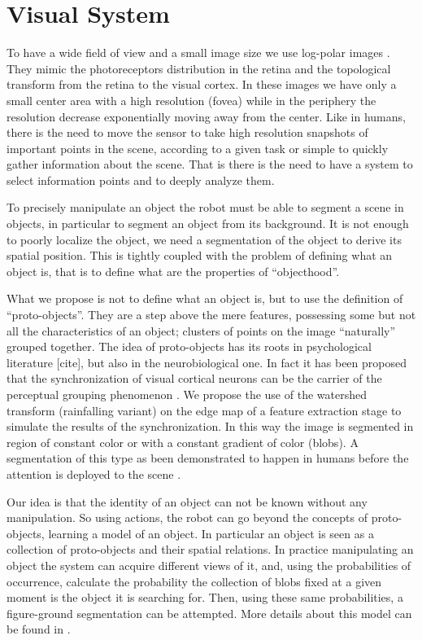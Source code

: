 \section{Visual System}
To have a wide field of view and a small image size we use log-polar images \cite{sandini80retinalike}. They mimic the photoreceptors distribution in the retina and the topological transform from the retina to the visual cortex. In these images we have only a small center area with a high resolution (fovea) while in the periphery the resolution decrease exponentially moving away from the center. Like in humans, there is the need to move the sensor to take high resolution snapshots of important points in the scene, according to a given task or simple to quickly gather information about the scene. That is there is the need to have a system to select information points and to deeply analyze them.

To precisely manipulate an object the robot must be able to segment a scene in objects, in particular to segment an object from its background. It is not enough to poorly localize the object, we need a segmentation of the object to derive its spatial position. This is tightly coupled with the problem of defining what an object is, that is to define what are the properties of ``objecthood''.

What we propose is not to define what an object is, but to use the definition of ``proto-objects''. They are a step above the mere features, possessing some but not all the characteristics of an object; clusters of points on the image ``naturally'' grouped together. The idea of proto-objects has its roots in psychological literature [cite], but also in the neurobiological one. In fact it has been proposed that the synchronization of visual cortical neurons can be the carrier of the perceptual grouping phenomenon \cite{eckhorn88coherent,gray89oscillatory}. We propose the use of the watershed transform (rainfalling variant) \cite{smet00rainfalling} on the edge map of a feature extraction stage to simulate the results of the synchronization. In this way the image is segmented in region of constant color or with a constant gradient of color (blobs). A segmentation of this type as been demonstrated to happen in humans before the attention is deployed to the scene \cite{driver00segmentation}.

Our idea is that the identity of an object can not be known without any manipulation. So using actions, the robot can go beyond the concepts of proto-objects, learning a model of an object. In particular an object is seen as a collection of proto-objects and their spatial relations. In practice manipulating an object the system can acquire different views of it, and, using the probabilities of occurrence, calculate the probability the collection of blobs fixed at a given moment is the object it is searching for. Then, using these same probabilities, a figure-ground segmentation can be attempted. More details about this model can be found in \cite{orabona05object}.

